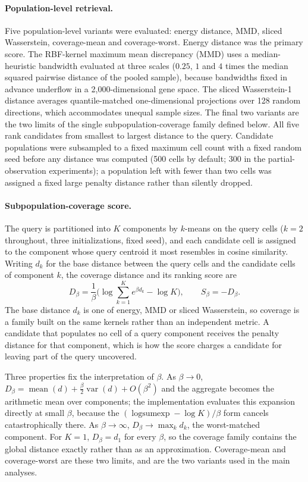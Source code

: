 \documentclass[11pt,letterpaper]{article}
\begin{document}
\paragraph{Population-level retrieval.}
Five population-level variants were evaluated: energy distance, MMD, sliced
Wasserstein, coverage-mean and coverage-worst. Energy distance\cite{EnergyDistance} was
the primary score. The RBF-kernel maximum mean discrepancy (MMD)\cite{MMD} uses a
median-heuristic bandwidth evaluated at three scales ($0.25$, $1$ and $4$ times the
median squared pairwise distance of the pooled sample), because bandwidths fixed in
advance underflow in a 2,000-dimensional gene space. The sliced Wasserstein-1
distance\cite{SlicedWasserstein} averages quantile-matched one-dimensional projections
over 128 random directions, which accommodates unequal sample sizes. The final two
variants are the two limits of the single subpopulation-coverage family defined below.
All five rank candidates from smallest to largest distance to the query. Candidate
populations were subsampled to a fixed maximum cell count with a fixed random seed
before any distance was computed (500 cells by default; 300 in the partial-observation
experiments); a population left with fewer than two cells was assigned a fixed large
penalty distance rather than silently dropped.

\paragraph{Subpopulation-coverage score.}
The query is partitioned into $K$ components by $k$-means on the query cells ($k=2$
throughout, three initializations, fixed seed), and each candidate cell is assigned to
the component whose query centroid it most resembles in cosine similarity. Writing
$d_k$ for the base distance between the query cells and the candidate cells of
component $k$, the coverage distance and its ranking score are
$$
D_\beta=\frac{1}{\beta}\Big(\log\sum_{k=1}^{K}e^{\beta d_k}-\log K\Big),
\qquad
S_\beta=-D_\beta .
$$
The base distance $d_k$ is one of energy, MMD or sliced Wasserstein, so coverage is a
family built on the same kernels rather than an independent metric. A candidate that
populates no cell of a query component receives the penalty distance for that
component, which is how the score charges a candidate for leaving part of the query
uncovered.

Three properties fix the interpretation of $\beta$. As $\beta\rightarrow0$,
$D_\beta=\operatorname{mean}(d)+\tfrac{\beta}{2}\operatorname{var}(d)+O(\beta^{2})$ and
the aggregate becomes the arithmetic mean over components; the implementation evaluates
this expansion directly at small $\beta$, because the
$(\operatorname{logsumexp}-\log K)/\beta$ form cancels catastrophically there. As
$\beta\rightarrow\infty$, $D_\beta\rightarrow\max_k d_k$, the worst-matched component.
For $K=1$, $D_\beta=d_1$ for every $\beta$, so the coverage family contains the global
distance exactly rather than as an approximation. Coverage-mean and coverage-worst are
these two limits, and are the two variants used in the main analyses.
\end{document}
